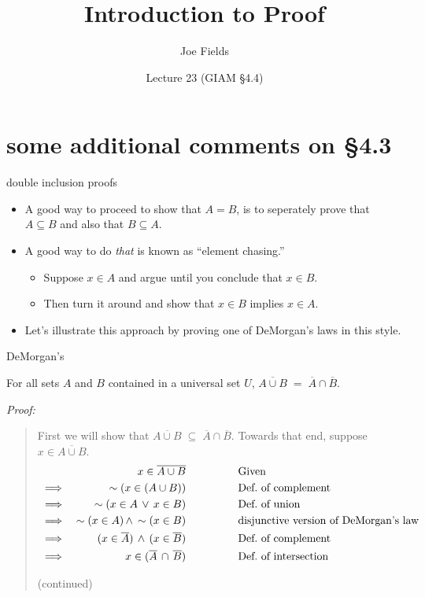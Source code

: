 \documentclass[handout,landscape]{beamer}
\author{Joe Fields}
\title{Introduction to Proof}
\date{Lecture 23 (GIAM \S 4.4) \newline }
\institute[SCSU]{ {\tt fieldsj1@southernct.edu} }
\begin{document}
\begin{frame}[plain]
  \titlepage
\end{frame}

\section{some additional comments on \S 4.3}

\begin{frame}{double inclusion proofs}
\begin{itemize}
\item A good way to proceed to show that $A=B$, is to seperately prove that $A \subseteq B$ and also that $B \subseteq A$.  \pause
\item A good way to do {\em that} is known as ``element chasing.'' \pause
\begin{itemize}
\item Suppose $x \in A$ and argue until you conclude that $x \in B$. \pause 
\item Then turn it around and show that $x \in B$ implies $x \in A$.
\end{itemize}
\item Let's illustrate this approach by proving one of DeMorgan's laws in this style.
\end{itemize}
\end{frame}

\begin{frame}{DeMorgan's}
\begin{thm*}
For all sets $A$ and $B$ contained in a universal set $U$,
$ \overline{A \cup B} \; = \; \overline{A} \cap \overline{B}.$
\end{thm*}
{\em Proof:}
\begin{quote}
First we will show that $\overline{A \cup B} \; \subseteq \; \overline{A} \cap \overline{B} $.\newline
Towards that end, suppose $x \in \overline{A \cup B}$. 
\begin{align*}
 &      & x \in \overline{A \cup B} \rule{48pt}{0pt} & \mbox{Given} & \\
 & \implies & \lnot (x \in (A \cup B)) \rule{48pt}{0pt} & \mbox{Def.\ of complement} & \\
 & \implies & \lnot (x \in A \, \lor \, x \in B) \rule{48pt}{0pt} & \mbox{Def.\ of union} & \\
 & \implies & \lnot (x \in A) \, \land  \, \lnot (x \in B) \rule{48pt}{0pt} & \mbox{disjunctive version of DeMorgan's law } & \\
 & \implies &  (x \in \overline{A}) \, \land  \, (x \in \overline{B}) \rule{48pt}{0pt} & \mbox{Def.\ of complement} & \\
 & \implies &  x \in ( \overline{A} \, \cap \, \overline{B}) \rule{48pt}{0pt} & \mbox{Def.\ of intersection} & \\
\end{align*}

(continued)

\end{quote}
\end{frame}
\end{document}
